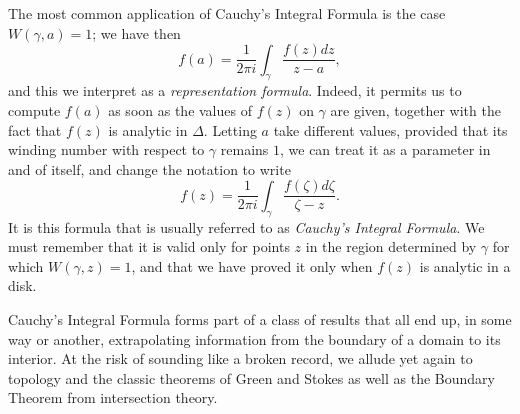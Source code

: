 The most common application of Cauchy's Integral Formula is the case $W(\gamma, a)=1$; we have then $$f(a)=\dfrac{1}{2\pi i}\int_{\gamma} \dfrac{f(z)dz}{z-a},$$ and this we interpret as a \emph{representation formula}. Indeed, it permits us to compute $f(a)$ as soon as the values of $f(z)$ on $\gamma$ are given, together with the fact that $f(z)$ is analytic in $\Delta$. Letting $a$ take different values, provided that its winding number with respect to $\gamma$ remains $1$, we can treat it as a parameter in and of itself, and change the notation to write $$f(z)=\dfrac{1}{2\pi i}\int_{\gamma} \dfrac{f(\zeta)d\zeta}{\zeta-z}.$$ It is this formula that is usually referred to as \emph{Cauchy's Integral Formula}. We must remember that it is valid only for points $z$ in the region determined by $\gamma$ for which $W(\gamma, z)=1$, and that we have proved it only when $f(z)$ is analytic in a disk.

Cauchy's Integral Formula forms part of a class of results that all end up, in some way or another, extrapolating information from the boundary of a domain to its interior. At the risk of sounding like a broken record, we allude yet again to topology and the classic theorems of Green and Stokes as well as the Boundary Theorem from intersection theory. 
